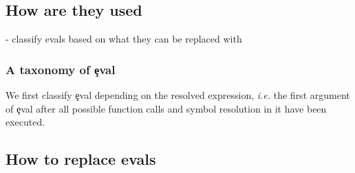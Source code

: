 \documentclass[conference]{IEEEtran}
\begin{document}
\begin{table}[ht]
  \label{table:site-package-summary}
  \caption{Distribution of callsites across packages}
\end{table}



\subsection{How are they used}

- classify evals based on what they can be replaced with

\subsubsection{A taxonomy of \c{eval}}

We first classify \c{eval} depending on the resolved expression, \emph{i.e.}
the first argument of \c{eval} after all possible function calls and symbol
resolution in it have been executed.




\subsection{How to replace evals}
\end{document}

